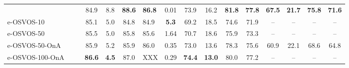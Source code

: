 \documentclass{article}
\begin{document}
\begin{table*}
{\begin{tabular}[t]{lcc cccHc cccc cccc}
~\cite{luiten2018premvos}   & & & 84.9 & 8.8  & {\bf 88.6} & {\bf 86.8} & 0.01 & 73.9 & 16.2 & \textbf{81.8} & {\bf 77.8} & \textbf{67.5} & \textbf{21.7} & \textbf{75.8} & \textbf{71.6}\\

        \cmidrule(r){1-3} \cmidrule(lr){4-8} \cmidrule(lr){9-12} \cmidrule(lr){13-16}

        e-OSVOS-10                       &  & & 85.1 & 5.0  & 84.8 & 84.9 & \textbf{5.3} & 69.2  & 18.5 & 74.6 & 71.9 &--&--&--&--\\
        e-OSVOS-50                       &  & & 85.5 & 5.0  & 85.8 & 85.6 & 1.64 & 70.7  & 18.6 & 75.9 & 73.3  &--&--&--&--\\

        \cmidrule(r){1-3} \cmidrule(lr){4-8} \cmidrule(lr){9-12} \cmidrule(lr){13-16}

        e-OSVOS-50-OnA                   &  & & 85.9 & 5.2  & 85.9 & 86.0 & 0.35 & 73.0  & 13.6 & 78.3 & 75.6 & 60.9 & 22.1 & 68.6 & 64.8\\
        e-OSVOS-100-OnA                   &  & & \textbf{86.6} & \textbf{4.5}  & 87.0 & XXX & 0.29 & \textbf{74.4}  & \textbf{13.0} & 80.0 & 77.2  &--&--&--&--\\
        \bottomrule
    \end{tabular}
    }
\label{tab:comparison_all}
\end{table*}     \begin{table*}
    \centering
\caption{
        VOS performance evaluated on the \textbf{YouTube-VOS} validation set.
This benchmark additionally evaluates the performance on completely unseen object classes.
Results of other methods are copied from~\cite{STM_19}.
}
\end{table*}
\end{document}
